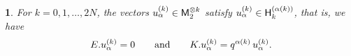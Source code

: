 \documentclass[oneside,english]{amsart}
\numberwithin{equation}{section}
\numberwithin{figure}{section}
\theoremstyle{plain}
\theoremstyle{plain}
\theoremstyle{plain}
\newtheorem{lem}{\protect\lemmaname}
\theoremstyle{remark}
\theoremstyle{plain}
\theoremstyle{plain}
\theoremstyle{plain}
\theoremstyle{plain}
\theoremstyle{plain}
\theoremstyle{plain}
\theoremstyle{plain}
\theoremstyle{plain}
\providecommand{\lemmaname}{Lemma}
\begin{document}
\begin{lem}\label{lem: recursively defined vectors}
For $k=0,1,\ldots,2N$,
the vectors $u_\alpha^{(k)} \in \mathsf{M}_2^{\otimes k}$
satisfy $u_\alpha^{(k)} \in \mathsf{H}_{k}^{(\alpha(k))}$, that is, we have
\begin{align}\label{eq: hwv properties of u} 
E.u_\alpha^{(k)} = 0 \qquad \text{and} \qquad K.u_\alpha^{(k)} 
= q^{\alpha(k)}\,u_\alpha^{(k)}.
\end{align}
\end{lem}
\end{document}
